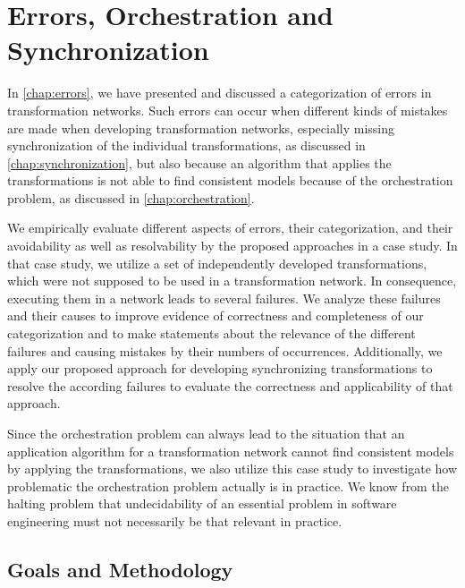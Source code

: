 \section{Errors, Orchestration and Synchronization}
\label{chap:correctness_evaluation:categorization}

In \autoref{chap:errors}, we have presented and discussed a categorization of errors in transformation networks.
Such errors can occur when different kinds of mistakes are made when developing transformation networks, especially missing synchronization of the individual transformations, as discussed in \autoref{chap:synchronization}, but also because an algorithm that applies the transformations is not able to find consistent models because of the orchestration problem, as discussed in \autoref{chap:orchestration}.

We empirically evaluate different aspects of errors, their categorization, and their avoidability as well as resolvability by the proposed approaches in a case study.
In that case study, we utilize a set of independently developed transformations, which were not supposed to be used in a transformation network.
In consequence, executing them in a network leads to several failures.
We analyze these failures and their causes to improve evidence of correctness and completeness of our categorization and to make statements about the relevance of the different failures and causing mistakes by their numbers of occurrences.
Additionally, we apply our proposed approach for developing synchronizing transformations to resolve the according failures to evaluate the correctness and applicability of that approach.

Since the orchestration problem can always lead to the situation that an application algorithm for a transformation network cannot find consistent models by applying the transformations, we also utilize this case study to investigate how problematic the orchestration problem actually is in practice.
We know from the halting problem that undecidability of an essential problem in software engineering must not necessarily be that relevant in practice.


\subsection{Goals and Methodology}

